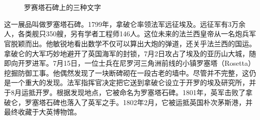 \documentclass[b5paper]{ctexart}
\begin{document}
\begin{figure}[htbp]
  \centering
   \\
   \\
  \caption{罗赛塔石碑上的三种文字}
  \label{fig:rosetta-stone}
 \end{figure}

这一展品叫做罗塞塔石碑。1799年，拿破仑率领法军远征埃及。远征军有3万余人，各类舰只350艘，另有学者工程师146人。这位未来的法兰西皇帝从一名炮兵军官脱颖而出。他敏锐地看出数学不仅可以算出大炮的弹道，还关乎法兰西的国运。拿破仑的大军巧妙地避开了英国海军的封锁，7月2日攻占了埃及的亚历山大城，随即向开罗进军。7月15日，一位士兵在尼罗河三角洲前线的小镇罗塞塔（Rosetta）挖掘防御工事。他偶然发现了一块断碑砌在一段古老的墙中。尽管并不完整，这仍是一个重大的发现。法军指挥官决定把它送到拿破仑设立于开罗的埃及研究所，并于8月运抵开罗。根据发现地点，它被命名为罗塞塔石碑。1801年，英军击败了拿破仑，罗塞塔石碑也落入了英军之手。1802年2月，它被运抵英国朴次茅斯港，并最终收藏于大英博物馆。
\end{document}
